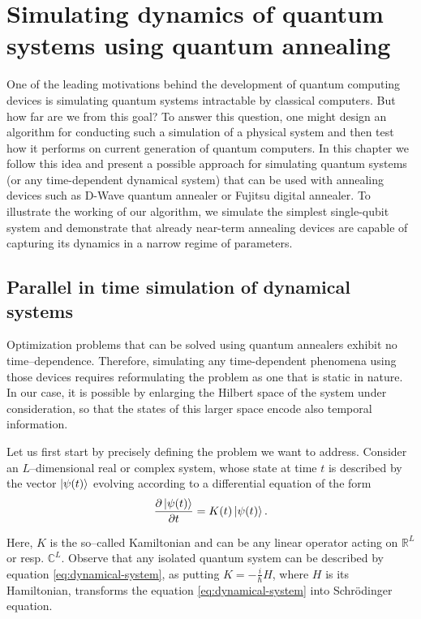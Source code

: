 \chapter{Simulating dynamics of quantum systems using quantum annealing}
\label{chapter:simulating}

One of the leading motivations behind the development of quantum computing devices is simulating quantum systems intractable by classical computers. But how far are we from this goal? To answer this question, one might design an algorithm for conducting such a simulation of a physical system and then test how it performs on current generation of quantum computers. In this chapter we follow this idea and present a possible approach for simulating quantum systems (or any time-dependent dynamical system) that can be used with annealing devices such as D-Wave quantum annealer or Fujitsu digital annealer. To illustrate the working of our algorithm, we simulate the simplest single-qubit system and demonstrate that already near-term annealing devices are capable of capturing its dynamics in a narrow regime of parameters.

\section{Parallel in time simulation of dynamical systems}
Optimization problems that can be solved using quantum annealers exhibit no time--dependence. Therefore, simulating any time-dependent phenomena using those devices requires reformulating the problem as one that is static in nature. In our case, it is possible by enlarging the Hilbert space of the system under consideration, so that the states of this larger space encode also temporal information.

Let us first start by precisely defining the problem we want to address.
Consider an $L$--dimensional real or complex system, whose state at time $t$
is described by the vector $\ket{\psi(t)}$  evolving according to a differential equation of
the form
\begin{equation}
	\label{eq:dynamical-system}
	\frac{\partial \ket{\psi(t)}}{\partial t} = K(t) \ket{\psi(t)}.
\end{equation}

Here, $K$ is the so--called Kamiltonian and can be any linear operator acting on $\mathbb{R}^L$ or
resp. $\mathbb{C}^L$. Observe that any isolated quantum system can be described by equation
\eqref{eq:dynamical-system}, as putting $K=-\frac{i}{\hbar}H$, where $H$ is its Hamiltonian,
transforms the equation \eqref{eq:dynamical-system} into Schr\"{o}dinger equation.

